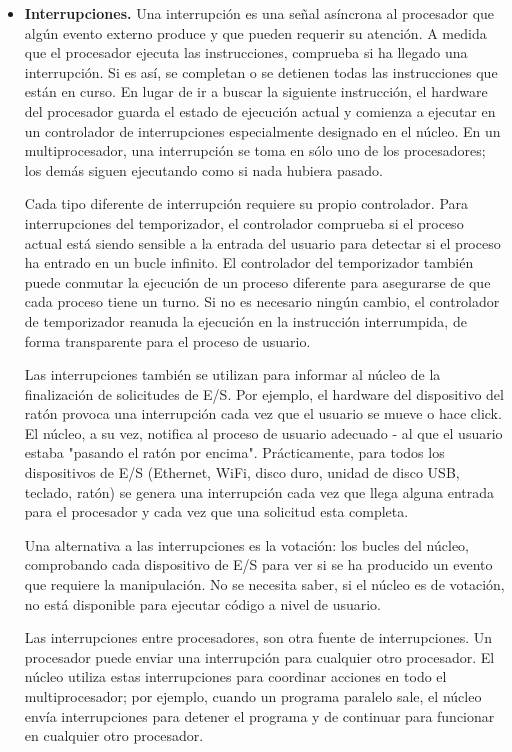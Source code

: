 \documentclass[10pt]{book}
\begin{document}
\begin{itemize}
\item \textbf{Interrupciones.} Una interrupción es una señal asíncrona al procesador que algún evento externo produce y que pueden requerir su atención. A medida que el procesador ejecuta las instrucciones, comprueba si ha llegado una interrupción. Si es así, se completan o se detienen todas las instrucciones que están en curso. En lugar de ir a buscar la siguiente instrucción, el hardware del procesador guarda el estado de ejecución actual y comienza a ejecutar en un controlador de interrupciones especialmente designado en el núcleo. En un multiprocesador, una interrupción se toma en sólo uno de los procesadores; los demás siguen ejecutando como si nada hubiera pasado.

Cada tipo diferente de interrupción requiere su propio controlador. Para interrupciones del temporizador, el controlador comprueba si el proceso actual está siendo sensible a la entrada del usuario para detectar si el proceso ha entrado en un bucle infinito. El controlador del temporizador también puede conmutar la ejecución de un proceso diferente para asegurarse de que cada proceso tiene un turno. Si no es necesario ningún cambio, el controlador de temporizador reanuda la ejecución en la instrucción interrumpida, de forma transparente para el proceso de usuario.

Las interrupciones también se utilizan para informar al núcleo de la finalización de solicitudes de E/S. Por ejemplo, el hardware del dispositivo del ratón provoca una interrupción cada vez que el usuario se mueve o hace click. El núcleo, a su vez, notifica al proceso de usuario adecuado - al que el usuario estaba "pasando el ratón por encima". Prácticamente, para todos los dispositivos de E/S (Ethernet, WiFi, disco duro, unidad de disco USB, teclado, ratón) se genera una interrupción cada vez que llega alguna entrada para el procesador y cada vez que una solicitud esta completa.

Una alternativa a las interrupciones es la votación: los bucles del núcleo, comprobando cada dispositivo de E/S para ver si se ha producido un evento que requiere la manipulación. No se necesita saber, si el núcleo es de votación, no está disponible para ejecutar código a nivel de usuario.

Las interrupciones entre procesadores, son otra fuente de interrupciones. Un procesador puede enviar una interrupción para cualquier otro procesador. El núcleo utiliza estas interrupciones para coordinar acciones en todo el multiprocesador; por ejemplo, cuando un programa paralelo sale, el núcleo envía interrupciones para detener el programa y de continuar para funcionar en cualquier otro procesador.


\end{itemize}
\end{document}
